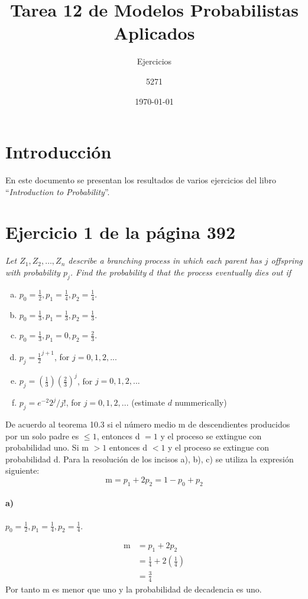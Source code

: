 \documentclass{article}
\title{Tarea 12 de Modelos Probabilistas Aplicados}
\subtitle{Ejercicios}
\author{5271}
\date{\today}
\begin{document}
\maketitle
\section{Introducción}
En este documento se presentan los resultados de varios ejercicios del libro ``\textit{Introduction to Probability}''\cite{libProba}.
\section{Ejercicio 1 de la página 392}
\textit{Let $Z_1, Z_2, \ldots, Z_n$ describe a branching process in which each parent has $j$ offspring with probability $p_j$. Find the probability $d$ that the process eventually dies out if}
\begin{enumerate}[a)]
				\item $p_0 = \frac{1}{2}, p_1 = \frac{1}{4}, p_2 = \frac{1}{4}$.
				\item $p_0 = \frac{1}{3}, p_1 = \frac{1}{3}, p_2 = \frac{1}{3}$.
				\item $p_0 = \frac{1}{3}, p_1 = 0, p_2 = \frac{2}{3}$.
				\item $p_j = \frac{1}{2}^{j + 1}$, for $j = 0, 1, 2,... $
				\item $p_j = (\frac{1}{3}) (\frac{2}{3})^j$, for $j = 0, 1, 2,... $
				 \item $p_j = e^{-2} 2^j / j!$, for $j = 0, 1, 2,... $ (estimate $d$ nummerically)
			\end{enumerate}
De acuerdo al teorema 10.3 si el número medio m de descendientes producidos por un solo padre es $\leq 1$, entonces d $= 1$ y el proceso se extingue con probabilidad uno. Si m $> 1$ entonces d $< 1$ y el proceso se extingue con probabilidad d. 
Para la resolución de los incisos a), b), c) se utiliza la expresión siguiente:
\begin{equation}
\mathrm{m}  = p_{1}+2p_{2} = 1-p_{0}+p_{2}    
\end{equation}
\paragraph{a)}$p_0 = \frac{1}{2}, p_1 = \frac{1}{4}, p_2 = \frac{1}{4}$.

 \begin{align}
   \mathrm{m}  &= p_{1}+2p_{2} \\
               &= \frac{1}{4} + 2\left(\frac{1}{4}\right)\\
               &= \frac{3}{4}
 \end{align}
Por tanto m es menor que uno y la probabilidad de decadencia es uno.
 
\end{document}

